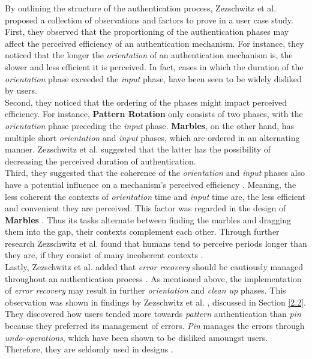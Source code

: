 By outlining the structure of the authentication process, Zezschwitz et al. \cite{Zezschwitz} proposed a collection of observations and factors to prove in a user case study. First, they observed that the proportioning of the authentication phases may affect the perceived efficiency of an authentication mechanism. For instance, they noticed that the longer the \textit{orientation} of an authentication mechanism is, the slower and less efficient it is perceived. In fact, cases in which the duration of the \textit{orientation} phase exceeded the \textit{input} phase, have been seen to be widely disliked by users. \\

Second, they noticed that the ordering of the phases might impact perceived efficiency. For instance, \textbf{Pattern Rotation} only consists of two phases, with the \textit{orientation} phase preceding the \textit{input} phase. \textbf{Marbles}, on the other hand, has multiple short \textit{orientation} and \textit{input} phases, which are ordered in an alternating manner. Zezschwitz et al. \cite{Zezschwitz} suggested that the latter has the possibility of decreasing the perceived duration of authentication. \\

Third, they suggested that the coherence of the \textit{orientation} and \textit{input} phases also have a potential influence on a mechanism's perceived efficiency \cite{Zezschwitz}. Meaning, the less coherent the contexts of \textit{orientation} time and \textit{input} time are, the less efficient and convenient they are perceived. This factor was regarded in the design of \textbf{Marbles} \cite{Marbles}. Thus its tasks alternate between finding the marbles and dragging them into the gap, their contexts complement each other. Through further research Zezschwitz et al. \cite{Zezschwitz} found that humans tend to perceive periods longer than they are, if they consist of many incoherent contexts \cite{Zezschwitz,perception}.\\

Lastly, Zezschwitz et al. \cite{Zezschwitz} added that \textit{error recovery} should be cautiously managed throughout an authentication process \cite{Zezschwitz}. As mentioned above, the implementation of \textit{error recovery} may result in further \textit{orientation} and \textit{clean up} phases. This observation was shown in findings by Zezschwitz et al. \cite{PatternWild}, discussed in Section \ref{2.2}. They discovered how users tended more towards \textit{pattern} authentication than \textit{pin} because they preferred its management of errors. \textit{Pin} manages the errors through \textit{undo-operations}, which have been shown to be disliked amoungst users. Therefore, they are seldomly used in designs \cite{PatternWild, Zezschwitz}. 

